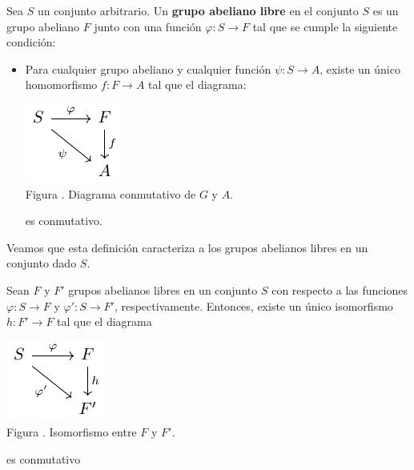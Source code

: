 \documentclass[12pt]{report}
\newcounter{it}
\theoremstyle{largebreak}
\newcommand\cf[3]{\ensuremath{#1:#2\rightarrow#3}}
\newcounter{figcount}
\begin{document}
    \begin{mydef}
        Sea $S$ un conjunto arbitrario. Un \textbf{grupo abeliano libre} en el conjunto $S$ es un grupo abeliano $F$ junto con una función $\cf{\varphi}{S}{F}$ tal que se cumple la siguiente condición:
        \begin{itemize}
            \item Para cualquier grupo abeliano y cualquier función $\cf{\psi}{S}{A}$, existe un único homomorfismo $\cf{f}{F}{A}$ tal que el diagrama:
            
            \begin{minipage}{\textwidth}
                \begin{center}
                    \includegraphics[scale=1.5]{images/fig_2.pdf}\\
                    Figura \thefigcount. Diagrama conmutativo de $G$ y $A$.
                \end{center}
            \end{minipage}
            
            es conmutativo.
        \end{itemize}
    \end{mydef}

    Veamos que esta definición caracteriza a los grupos abelianos libres en un conjunto dado $S$.

    \begin{propo}
        Sean $F$ y $F'$ grupos abelianos libres en un conjunto $S$ con respecto a las funciones $\cf{\varphi}{S}{F}$ y $\cf{\varphi'}{S}{F'}$, respectivamente. Entonces, existe un único isomorfismo $\cf{h}{F'}
        {F}$ tal que el diagrama
        
        \begin{minipage}{\textwidth}
            \begin{center}
                \includegraphics[scale=1.5]{images/fig_6.pdf}\\
                Figura \thefigcount. Isomorfismo entre $F$ y $F'$.
            \end{center}
        \end{minipage}

        es conmutativo
    \end{propo}
\end{document}
